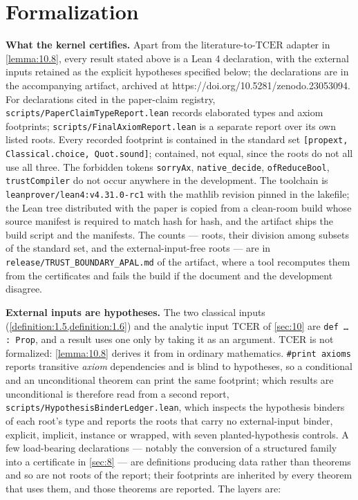 \documentclass[11pt]{article}
\theoremstyle{plain}
\theoremstyle{definition}
\theoremstyle{remark}
\theoremstyle{plain}
\theoremstyle{definition}
\theoremstyle{remark}
\theoremstyle{plain}
\theoremstyle{definition}
\theoremstyle{remark}
\begin{document}
\section{Formalization}\label{sec:12}
\textbf{What the kernel certifies.} Apart from the literature-to-$\mathrm{TCER}$ adapter in \cref{lemma:10.8}, every result stated above is a Lean 4 declaration, with the external inputs retained as the explicit hypotheses specified below; the declarations are in the accompanying artifact, archived at https://doi.org/10.5281/zenodo.23053094. For declarations cited in the paper-claim registry, \texttt{scripts/PaperClaimTypeReport.\allowbreak{}lean} records elaborated types and axiom footprints; \texttt{scripts/FinalAxiomReport.\allowbreak{}lean} is a separate report over its own listed roots. Every recorded footprint is contained in the standard set \texttt{[propext, Classical.\allowbreak{}choice, Quot.\allowbreak{}sound]}; contained, not equal, since the roots do not all use all three. The forbidden tokens \texttt{sorryAx}, \texttt{native\_\allowbreak{}decide}, \texttt{ofReduceBool}, \texttt{trustCompiler} do not occur anywhere in the development. The toolchain is \texttt{leanprover/lean4:v4.\allowbreak{}31.\allowbreak{}0-rc1} with the mathlib revision pinned in the lakefile; the Lean tree distributed with the paper is copied from a clean-room build whose source manifest is required to match hash for hash, and the artifact ships the build script and the manifests. The counts — roots, their division among subsets of the standard set, and the external-input-free roots — are in \texttt{release/TRUST\_\allowbreak{}BOUNDARY\_\allowbreak{}APAL.\allowbreak{}md} of the artifact, where a tool recomputes them from the certificates and fails the build if the document and the development disagree.

\textbf{External inputs are hypotheses.} The two classical inputs (\cref{definition:1.5,definition:1.6}) and the analytic input $\mathrm{TCER}$ of \cref{sec:10} are \texttt{def … : Prop}, and a result uses one only by taking it as an argument. $\mathrm{TCER}$ is not formalized: \cref{lemma:10.8} derives it from \cite{KK26} in ordinary mathematics. \texttt{\#print axioms} reports transitive \emph{axiom} dependencies and is blind to hypotheses, so a conditional and an unconditional theorem can print the same footprint; which results are unconditional is therefore read from a second report, \texttt{scripts/HypothesisBinderLedger.\allowbreak{}lean}, which inspects the hypothesis binders of each root's type and reports the roots that carry no external-input binder, explicit, implicit, instance or wrapped, with seven planted-hypothesis controls. A few load-bearing declarations — notably the conversion of a structured family into a certificate in \cref{sec:8} — are definitions producing data rather than theorems and so are not roots of the report; their footprints are inherited by every theorem that uses them, and those theorems are reported. The layers are:
\end{document}
